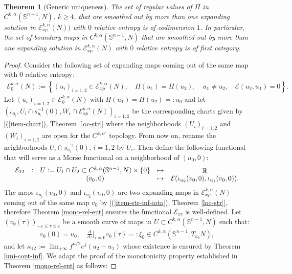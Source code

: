 \documentclass[a4paper,11pt,reqno]{amsart}
\newtheorem{theo}[defn]{Theorem}
\def\R{\mathop{\rm \mathbb{R}}\nolimits}
\newcommand{\Ent}{\mathcal{E}}
\begin{document}
\begin{theo}[Generic uniqueness]\label{theo-gen-uni}
The set of regular values of $\Pi$ in $C^{k,\alpha}(\mathbb{S}^{n-1},N)$, $k\geq 4$, that are smoothed out by more than one expanding solution in $\Ent_{xp}^{k,\alpha}(N))$ with $0$ relative entropy is of codimension $1$. In particular, the set of boundary maps in $C^{k,\alpha}(\mathbb{S}^{n-1},N)$ that are smoothed out by more than one expanding solution in $\Ent_{xp}^{k,\alpha}(N)$ with $0$ relative entropy is of first category.
\end{theo}
\begin{proof}
Consider the following set of expanding maps coming out of the same map with $0$ relative entropy:
\begin{eqnarray*}
\mathcal{E}^{k,\alpha}_0(N):=\left\{(u_i)_{i=1,2}\in \Ent_{xp}^{k,\alpha}(N),\quad \Pi(u_1)=\Pi(u_2),\quad u_1\neq u_2,\quad \mathcal{E}(u_2,u_1)=0 \right\}.
\end{eqnarray*}
Let $(u_i)_{i=1,2}\in \mathcal{E}^{k,\alpha}_0(N)$ with $\Pi(u_1)=\Pi(u_2)=:u_0$ and let $(\iota_{u_i},U_i\cap s_{u_i}^{-1}(0),W_i\cap \Ent_{xp}^{k,\alpha}(N))_{i=1,2}$ be the corresponding charts given by [(\ref{item-chart}), Theorem \ref{loc-str}] where the neighborhoods $(U_i)_{i=1,2}$ and $(W_i)_{i=1,2}$ are open for the $C^{k,\alpha'}$ topology. From now on, rename the neighborhoods $U_i\cap s_{u_i}^{-1}(0)$, $i=1,2$ by $U_i$. Then define the following functional that will serve as a Morse functional on a neighborhood of $(u_0,0)$:
$$\begin{array}{ccccc}
\mathcal{E}_{12} & : & U:=U_1\cap U_2\subset C^{k,\alpha}(\mathbb{S}^{n-1},N)\times\{0\} & \mapsto & \R \\
 & & (v_0,0) & \mapsto & \mathcal{E}(\iota_{u_2}(v_0,0),\iota_{u_1}(v_0,0)). \\
\end{array}$$
The maps $\iota_{u_1}(v_0,0)$ and $\iota_{u_2}(v_0,0)$ are two expanding maps in $\mathcal{E}_{xp}^{k,\alpha}(N)$ coming out of the same map $v_0$ by [(\ref{item-str-inf-iota}), Theorem \ref{loc-str}], therefore Theorem \ref{mono-rel-ent} ensures the functional $\mathcal{E}_{12}$ is well-defined. Let $(v_0(\tau))_{-\varepsilon\leq \tau\leq \varepsilon}$ be a smooth curve of maps in $U\subset C^{k,\alpha}(\mathbb{S}^{n-1},N)$ such that:
\begin{eqnarray*}
v_0(0)=u_0,\quad \frac{d}{d\tau}\bigg\rvert_{\tau=0}v_0(\tau)=:\xi_0\in C^{k,\alpha}(\mathbb{S}^{n-1},T_{u_0}N),
\end{eqnarray*}
and let $\kappa_{12}:=\lim_{+\infty}f^{n/2}e^f(u_2-u_1)$ whose existence is ensured by Theorem \ref{uni-cont-inf}. We adapt the proof of the monotonicity property established in Theorem \ref{mono-rel-ent} as follows:

\end{proof}
\end{document}
